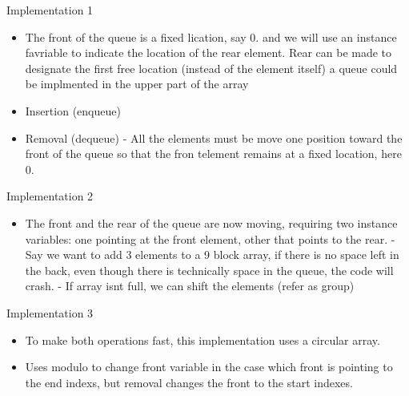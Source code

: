 \documentclass[11pt]{article}
\begin{document}
{Implementation 1}
\begin{itemize}
    
    \item The front of the queue is a fixed lication, say 0. and we will use an instance favriable to indicate the location of the rear element.
    \subitem Rear can be made to designate the first free location (instead of the element itself)
    \subitem a queue could be implmented in the upper part of the array
    \item Insertion (enqueue)
    \item Removal (dequeue)
    \subitem - All the elements must be move one position toward the front of the queue so that the fron telement remains at a fixed location, here 0.
\end{itemize}
{Implementation 2}
\begin{itemize}
    \item The front and the rear of the queue are now moving, requiring two instance variables: one pointing at the front element, other that points to the rear.
    \subitem - Say we want to add 3 elements to a 9 block array, if there is no space left in the back, even though there is technically space in the queue, the code will crash.
    \subitem - If array isnt full, we can shift the elements (refer as group)
\end{itemize}
{Implementation 3}
\begin{itemize}
    \item To make both operations fast, this implementation uses a circular array.
    \item Uses modulo to change front variable in the case which front is pointing to the end indexs, but removal changes the front to the start indexes.
\end{itemize}
\end{document}
